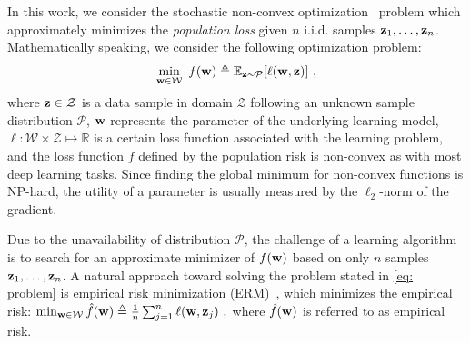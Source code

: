 \documentclass[11pt]{article}
\begin{document}
In this work, we consider the stochastic non-convex optimization~\cite{zare18} problem which approximately minimizes the \emph{population loss} given $n $ i.i.d. samples $\mathbf{z}_{1}, \dots, \mathbf{z}_{n}$. Mathematically speaking, we consider the following optimization problem:
\begin{equation} \label{eq: problem}
 \min_{\w \in \cW}~ f({\w})
 \triangleq {\mathbb{E}_{\z \sim \mathcal{P}}}[\ell(\w,\z)]~,
\end{equation}
where $\mathbf{z}\in \mathcal{Z}$ is a data sample in domain $\mathcal{Z}$ following an unknown sample distribution $\mathcal{P}$, ${\mathbf{w}}$ represents the parameter of the underlying learning model, $\ell:\mathcal{W}\times \mathcal{Z}\mapsto \mathbb{R} $ is a certain loss function associated with the learning problem, and the loss function $f$ defined by the population risk is non-convex as with most deep learning tasks. Since  finding the global minimum for non-convex functions
is NP-hard, the utility of a  parameter is usually measured by the $\ell_2$-norm of the gradient. 

Due to the unavailability of distribution $\mathcal{P}$,  the
challenge of a learning algorithm is to search for an approximate minimizer of $f(\mathbf{w})$ based on only 
$n$ samples $\mathbf{z}_{1}, \dots, \mathbf{z}_{n}$.
A natural approach toward solving the problem stated in \eqref{eq: problem} is empirical risk minimization (ERM)~\citep{shbe14}, which minimizes the empirical risk:  $\min_{\w \in \cW}  
   \hat f(\w)  \triangleq \frac{1}{n}\sum_{j =1}^{n} \ell(\w, \z_j)~,$
where $\hat f(\mathbf{w})$ is referred to as empirical risk. 

\end{document}
